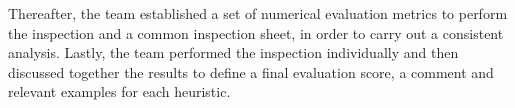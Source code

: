 Thereafter, the team established a set of numerical evaluation metrics to perform the inspection and a common inspection sheet, in order to carry out a consistent analysis.
Lastly, the team performed the inspection individually and then discussed together the results to define a final evaluation score, a comment and relevant examples for each heuristic.
\clearpage